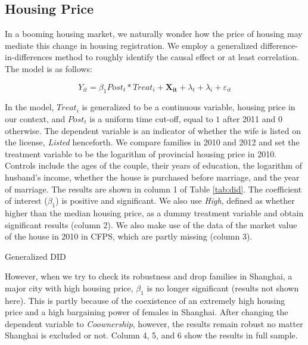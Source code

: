 \documentclass[11pt]{article}
\begin{document}
\subsection{Housing Price}

In a booming housing market, we naturally wonder how the price of housing may mediate this change in housing registration. We employ a generalized difference-in-differences method to roughly identify the causal effect or at least correlation. The model is as follows:

\begin{equation*}
    Y_{it} = \beta_1 Post_{t}* Treat_{i} + \mathbf{X_{it}} + \lambda_t + \lambda_i + \varepsilon_{it}
\end{equation*}

In the model, $Treat_{i}$ is generalized to be a continuous variable, housing price in our context, and $Post_t$ is a uniform time cut-off, equal to $1$ after 2011 and $0$ otherwise. The dependent variable is an indicator of whether the wife is listed on the license, \textit{Listed} henceforth. We compare families in 2010 and 2012 and set the treatment variable to be the logarithm of provincial housing price in 2010. Controls include the ages of the couple, their years of education, the logarithm of husband's income, whether the house is purchased before marriage, and the year of marriage. The results are shown in column 1 of Table \ref{tab:did}. The coefficient of interest ($\beta_1$) is positive and significant. We also use \textit{High}, defined as whether higher than the median housing price, as a dummy treatment variable and obtain significant results (column 2). We also make use of the data of the market value of the house in 2010 in CFPS, which are partly missing (column 3).  

\begin{table}
    \centering
    \caption{Generalized DID}
    \label{tab:did}
    \resizebox{\textwidth}{!}{
    }

\end{table}

However, when we try to check its robustness and drop families in Shanghai, a major city with high housing price, $\beta_1$ is no longer significant (results not shown here). This is partly because of the coexistence of an extremely high housing price and a high bargaining power of females in Shanghai. After changing the dependent variable to \textit{Coownership}, however, the results remain robust no matter Shanghai is excluded or not. Column 4, 5, and 6 show the results in full sample.
\end{document}
